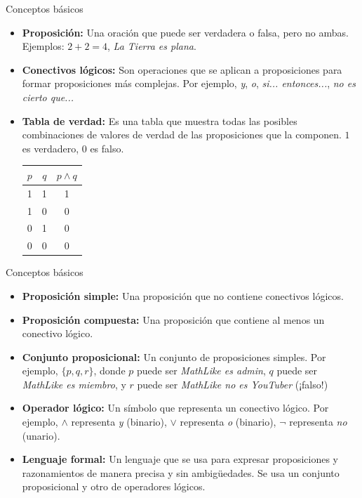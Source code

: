 \documentclass[dvisvgm,hypertex,aspectratio=169]{beamer}
\begin{document}
\begin{frame}{Conceptos básicos}
  \begin{itemize}[<+->]
    \item \textbf{Proposición:} Una oración que puede ser verdadera o falsa, pero no ambas. Ejemplos: $2+2=4$, \textit{La Tierra es plana}.
    \item \textbf{Conectivos lógicos:} Son operaciones que se aplican a proposiciones para formar proposiciones más complejas. Por ejemplo, \textit{y}, \textit{o}, \textit{si... entonces...}, \textit{no es cierto que...}
    \item \textbf{Tabla de verdad:} Es una tabla que muestra todas las posibles combinaciones de valores de verdad de las proposiciones que la componen. $1$ es verdadero, $0$ es falso.

    \begin{table}[h]
      \centering
      \begin{tabular}{|c|c|c|}
        \hline
        $p$ & $q$ & $p \land q$ \\ \hline
        1 & 1 & 1 \\ \hline
        1 & 0 & 0 \\ \hline
        0 & 1 & 0 \\ \hline
        0 & 0 & 0 \\ \hline
      \end{tabular}
    \end{table}
  \end{itemize}
\end{frame}
\begin{frame}{Conceptos básicos}
  \begin{itemize}[<+->]
    \item \textbf{Proposición simple:} Una proposición que no contiene conectivos lógicos.
    \item \textbf{Proposición compuesta:} Una proposición que contiene al menos un conectivo lógico.
    \item \textbf{Conjunto proposicional:} Un conjunto de proposiciones simples. Por ejemplo, $\{p, q, r\}$, donde $p$ puede ser \textit{MathLike es admin}, $q$ puede ser \textit{MathLike es miembro}, y $r$ puede ser \textit{MathLike no es YouTuber} (¡falso!) 
    \item \textbf{Operador lógico:} Un símbolo que representa un conectivo lógico. Por ejemplo, $\land$ representa \textit{y} (binario), $\lor$ representa \textit{o} (binario), $\neg$ representa \textit{no} (unario).
    \item \textbf{Lenguaje formal:} Un lenguaje que se usa para expresar proposiciones y razonamientos de manera precisa y sin ambigüedades. Se usa un conjunto proposicional y otro de operadores lógicos.
  \end{itemize}
\end{frame}
\end{document}
